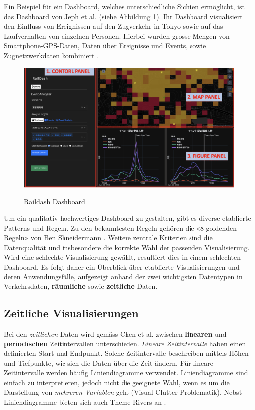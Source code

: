 Ein Beispiel für ein Dashboard, welches unterschiedliche Sichten ermöglicht, ist das Dashboard von Jeph et al. (siehe Abbildung \ref{fig_raildash}). Ihr Dashboard visualisiert den Einfluss von Ereignissen auf den Zugverkehr in Tokyo sowie auf das Laufverhalten von einzelnen Personen. Hierbei wurden grosse Mengen von Smartphone-GPS-Daten, Daten über Ereignisse und Events, sowie Zugnetzwerkdaten kombiniert \parencite{raildash_2022}.

\begin{figure}[H]
    \caption{Raildash Dashboard \parencite[S. 93]{raildash_2022}}
    \includegraphics[width=.5\linewidth]{content/00_assets/raildash.png}
    \label{fig_raildash}
\end{figure}

Um ein qualitativ hochwertiges Dashboard zu gestalten, gibt es diverse etablierte Patterns und Regeln. Zu den bekanntesten Regeln gehören die «8 goldenden Regeln» von Ben Shneidermann \parencite{golden_rules_dashboard}. Weitere zentrale Kriterien sind die Datenqualität und insbesondere die korrekte Wahl der passenden Visualisierung. Wird eine schlechte Visualisierung gewählt, resultiert dies in einem schlechten Dashboard. Es folgt daher ein Überblick über etablierte Visualisierungen und deren Anwendungsfälle, aufgezeigt anhand der zwei wichtigsten Datentypen in Verkehrsdaten, \textbf{räumliche} sowie \textbf{zeitliche} Daten. 

\subsection{Zeitliche Visualisierungen}
Bei den \textit{zeitlichen} Daten wird gemäss Chen et al. zwischen \textbf{linearen} und \textbf{periodischen} Zeitintervallen unterschieden. \textit{Lineare Zeitintervalle} haben einen definierten Start und Endpunkt. Solche Zeitintervalle beschreiben mittels Höhen- und Tiefpunkte, wie sich die Daten über die Zeit ändern. Für lineare Zeitintervalle werden häufig Liniendiagramme verwendet. Liniendiagramme sind einfach zu interpretieren, jedoch nicht die geeignete Wahl, wenn es um die Darstellung von \textit{mehreren Variablen} geht (Visual Clutter Problematik). Nebst Liniendiagramme bieten sich auch Theme Rivers an \parencite[S. 2973]{survey_traffic_data_visualization_2015}.

